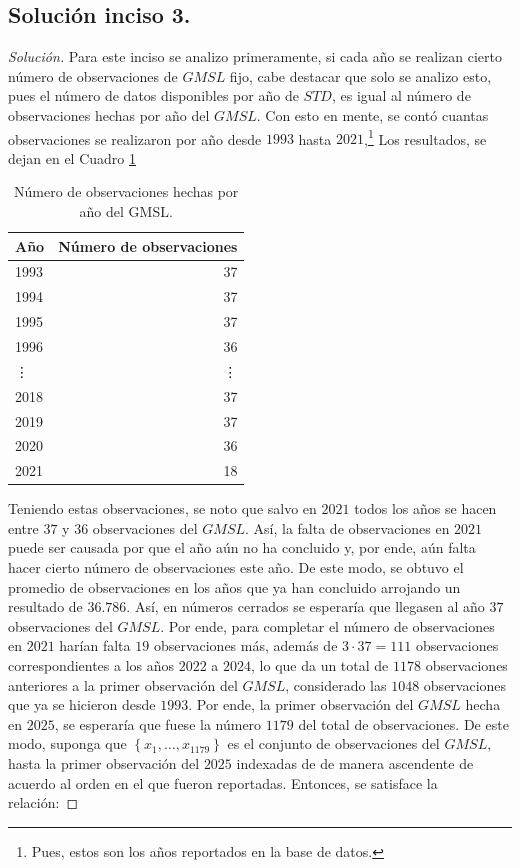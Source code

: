 \documentclass[10.5pt,notitlepage]{article}
\newenvironment{solucion}
  {\begin{proof}[Solución]}
  {\end{proof}}
\newcommand{\kis}[1]{\left\{ #1 \right\}}
\theoremstyle{plain}
\begin{document}
\subsection{Solución inciso 3.}
\begin{solucion}
Para este inciso se analizo primeramente, si cada año se realizan cierto número de observaciones de \(GMSL\) fijo, cabe destacar que solo se analizo esto, pues el número de datos disponibles por año de \(STD\), es igual al número de observaciones hechas por año del \(GMSL\). Con esto en mente, se contó cuantas observaciones se realizaron por año desde \(1993\) hasta \(2021\),\footnote{Pues, estos son los años reportados en la base de datos.} Los resultados, se dejan en el Cuadro \ref{tab:3.0}
\begin{table}[H]
        \centering
        \begin{tabular}{@{}l@{\hskip 0.3in}r@{}}
        \toprule
        Año &  Número de observaciones  \\
        \midrule         
         1993&    37\\
         1994&    37\\
         1995&    37\\
         1996&    36\\
         \vdots& \vdots\\ 
          2018&    37\\
          2019&    37\\
          2020&    36\\
          2021&    18\\
        \end{tabular}
        \caption{Número de observaciones hechas por año del GMSL.}
        \label{tab:3.0}
\end{table} 
Teniendo estas observaciones, se noto que salvo en \(2021\) todos los años se hacen entre \(37\) y \(36\) observaciones del \(GMSL\). Así, la falta de observaciones en \(2021\) puede ser causada por que el año aún no ha concluido y, por ende, aún falta hacer cierto número de observaciones este año. De este modo, se obtuvo el promedio de observaciones en los años que ya han concluido arrojando un resultado de \(36.786\). Así, en números cerrados se esperaría que llegasen al año \(37\) observaciones del \(GMSL\). Por ende, para completar el número de observaciones en \(2021\) harían falta \(19\) observaciones más, además de \(3\cdot 37 = 111\) observaciones correspondientes a los años \(2022\) a \(2024\), lo que da un total de \(1178\) observaciones anteriores a la primer observación del \(GMSL\), considerado las \(1048\) observaciones que ya se hicieron desde \(1993\). Por ende, la primer observación del \(GMSL\) hecha en \(2025\), se esperaría que fuese la número \(1179\) del total de observaciones. De este modo, suponga que \(\kis{x_1, \hdots, x_{1179}}\) es el conjunto de observaciones del \(GMSL\), hasta la primer observación del \(2025\) indexadas de de manera ascendente de acuerdo al orden en el que fueron reportadas. Entonces, se satisface la relación:  

\end{solucion}
\end{document}
